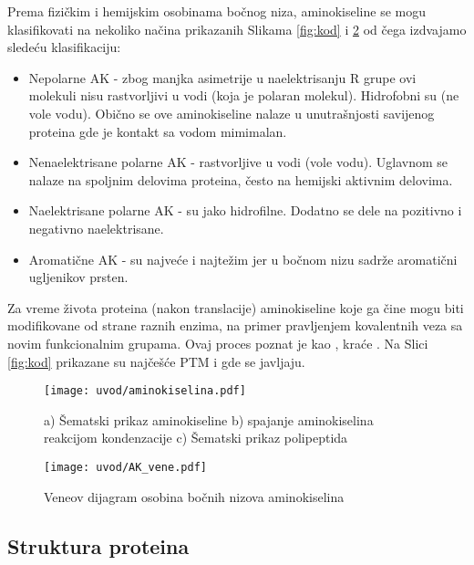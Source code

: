 Prema fizičkim i hemijskim osobinama bočnog niza, aminokiseline se mogu
klasifikovati na nekoliko načina prikazanih Slikama \ref{fig:kod} i
\ref{fig:AK_vene} od čega izdvajamo sledeću klasifikaciju:
\begin{itemize}
  \item Nepolarne AK -
    zbog manjka asimetrije u naelektrisanju R grupe ovi molekuli nisu
    rastvorljivi u vodi (koja je polaran molekul). Hidrofobni su (ne vole
    vodu).  Obično se ove aminokiseline nalaze u unutrašnjosti savijenog proteina gde
    je kontakt sa vodom mimimalan.
    
  \item Nenaelektrisane polarne AK -
    rastvorljive u vodi (vole vodu). Uglavnom se nalaze na spoljnim
    delovima proteina, često na hemijski aktivnim delovima.

  \item Naelektrisane polarne AK -
    su jako hidrofilne. Dodatno se dele na pozitivno i negativno naelektrisane.

  \item Aromatične AK - su najveće i najtežim jer u bočnom nizu sadrže
    aromatični ugljenikov prsten.
\end{itemize}

Za vreme života proteina (nakon translacije) aminokiseline koje ga čine mogu
biti modifikovane od strane raznih enzima, na primer pravljenjem kovalentnih
veza sa novim funkcionalnim grupama. Ovaj proces poznat je kao
, kraće .  Na Slici
\ref{fig:kod} prikazane su najčešće PTM i gde se javljaju.

\begin{figure}[th]
\centering
\texttt{[image: uvod/aminokiselina.pdf]}
\caption {a) Šematski prikaz aminokiseline
b) spajanje aminokiselina reakcijom kondenzacije
c) Šematski prikaz polipeptida
}
\label{fig:AK}
\end{figure}


\begin{figure}[th]
\centering
\texttt{[image: uvod/AK\_vene.pdf]}
\caption {Veneov dijagram osobina bočnih nizova aminokiselina}
\label{fig:AK_vene}
\end{figure}

\clearpage


\subsection{Struktura proteina}

